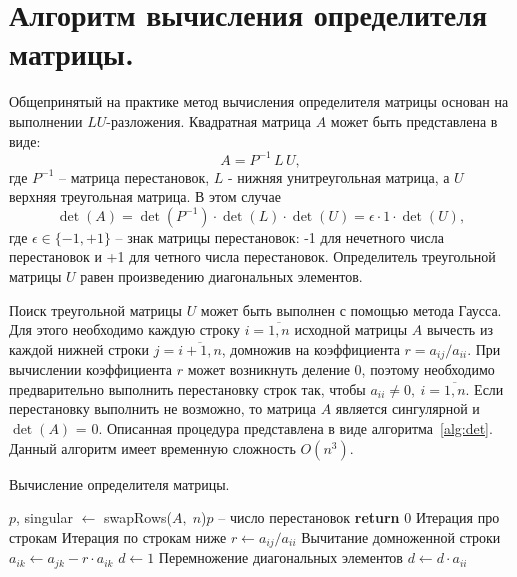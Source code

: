 \documentclass[a4paper,14pt]{extarticle}
\begin{document}
    \tableofcontents

    \newpage
    \section{Алгоритм вычисления определителя матрицы.}

    Общепринятый на практике метод вычисления определителя матрицы основан на выполнении $LU$-разложения.
    Квадратная матрица $A$ может быть представлена в виде:
    \begin{equation*}
        A = P^{-1} \, L \, U,
    \end{equation*}
    где $P^{-1}$ -- матрица перестановок, $L$ -  нижняя унитреугольная матрица, а $U$ верхняя треугольная матрица.
    В этом случае
    \begin{equation*}
        \det(A) = \det(P^{-1}) \cdot \det(L) \cdot \det(U) = \epsilon \cdot 1 \cdot \det(U),
    \end{equation*}
    где $\epsilon \in \{-1, +1\}$ -- знак матрицы перестановок:
    -1 для нечетного числа перестановок и +1 для четного числа перестановок.
    Определитель треугольной матрицы $U$ равен произведению диагональных элементов.

    Поиск треугольной матрицы $U$ может быть выполнен с помощью метода Гаусса.
    Для этого необходимо каждую строку $i = \overline{1, n}$ исходной матрицы $A$ вычесть из каждой нижней строки
    $j = \overline{i+1, n}$, домножив на коэффициента $r = a_{ij}/a_{ii}$.
    При вычислении коэффициента $r$ может возникнуть деление 0,
    поэтому необходимо предварительно выполнить перестановку строк так, чтобы $a_{ii} \neq 0, \: i = \overline{1, n}$.
    Если перестановку выполнить не возможно, то матрица $A$ является сингулярной и $\det(A)$ = 0.
    Описанная процедура представлена в виде алгоритма~\ref{alg:det}.
    Данный алгоритм имеет временную сложность $O(n^3)$.

    \begin{algorithm}[h]
        \caption{Вычисление определителя матрицы.}
        \label{alg:det}
        \begin{algorithmic}[1]
            \State $p$, singular $\gets$ swapRows($A, \; n$)\Comment $p$ -- число перестановок
            \State \textbf{return} $0$
            \EndIf
             \Comment Итерация про строкам
             \Comment Итерация по строкам ниже
            \State $r \gets a_{ij} / a_{ii}$
             \Comment Вычитание домноженной строки
            \State $a_{ik} \gets a_{jk} - r \cdot a_{ik} $
            \EndFor
            \EndFor
            \EndFor
            \State $d \gets 1$
            \Comment Перемножение диагональных элементов
            \State $d \gets d \cdot a_{ii}$
            \EndFor
        \end{algorithmic}
    \end{algorithm}
\end{document}

